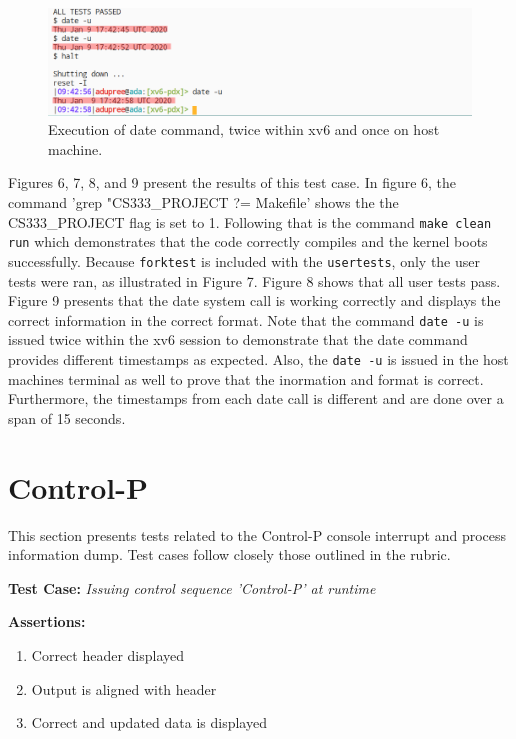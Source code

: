 \documentclass[11pt,letterpaper]{report}
\newcommand{\code}[1]{\colorbox{codegray}{\texttt{#1}}}
\begin{document}
{  \begin{figure}[h!]
	\centering
	\includegraphics[width=1\linewidth]{test4-cont3.png}
	\caption[PRINT\_SYSCALLS=0]{Execution of date command, twice within xv6 and once on host machine.}
	\label{fig:P1compileP0-1}
  \end{figure}

\pagebreak

  Figures 6, 7, 8, and 9 present the results of this test case. In figure 6,
  the command 'grep "CS333\_PROJECT ?= Makefile' shows the the CS333\_PROJECT flag is set to 1.
  Following that is the command \code{make clean run} which demonstrates that the code correctly 
  compiles and the kernel boots successfully. Because \code{forktest} is included with 
  the \code{usertests}, only the user tests were ran, as illustrated in Figure 7. Figure 8 shows
  that all user tests pass. Figure 9 presents that the date system call is working correctly and 
  displays the correct information in the correct format. Note that the command \code{date -u} is 
  issued twice within the xv6 session to demonstrate that the date command provides different timestamps
  as expected. Also, the \code{date -u} is issued in the host machines terminal as well to prove 
  that the inormation and format is correct. Furthermore, the timestamps from each date call is 
  different and are done over a span of 15 seconds. 

\pagebreak

  \section*{Control-P}
  This section presents tests related to the Control-P console interrupt 
  and process information dump. Test cases follow closely those outlined in the 
  rubric. \hfill \break

  \noindent\textbf{Test Case:} \emph{Issuing control sequence 'Control-P' at runtime}
  
  \noindent\textbf{Assertions:}
  \begin{enumerate}[]
  \item Correct header displayed
  \item Output is aligned with header
  \item Correct and updated data is displayed
  \end{enumerate}  
  
}
\end{document}

